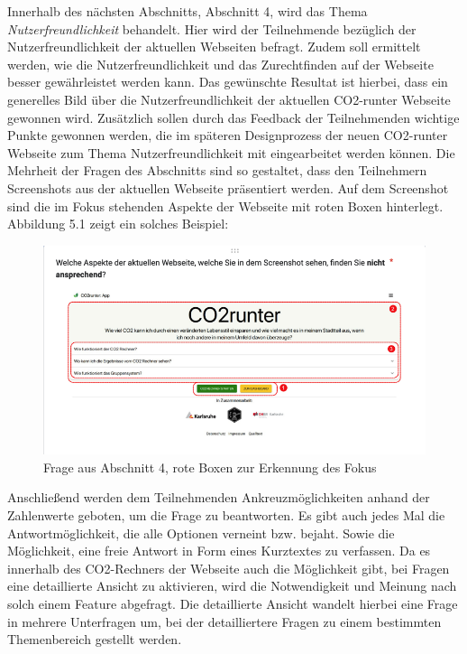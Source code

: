 Innerhalb des nächsten Abschnitts, Abschnitt 4, wird das Thema \textit{Nutzerfreundlichkeit} behandelt.
Hier wird der Teilnehmende bezüglich der Nutzerfreundlichkeit der aktuellen Webseiten befragt.
Zudem soll ermittelt werden, wie die Nutzerfreundlichkeit und das Zurechtfinden auf der Webseite besser gewährleistet werden kann.
Das gewünschte Resultat ist hierbei, dass ein generelles Bild über die Nutzerfreundlichkeit der aktuellen CO2-runter Webseite gewonnen wird.
Zusätzlich sollen durch das Feedback der Teilnehmenden wichtige Punkte gewonnen werden, die im späteren Designprozess der neuen CO2-runter Webseite zum Thema Nutzerfreundlichkeit mit eingearbeitet werden können.
Die Mehrheit der Fragen des Abschnitts sind so gestaltet, dass den Teilnehmern Screenshots aus der aktuellen Webseite präsentiert werden.
Auf dem Screenshot sind die im Fokus stehenden Aspekte der Webseite mit roten Boxen hinterlegt.
Abbildung 5.1 zeigt ein solches Beispiel:
\begin{figure}[h]
    \centering
    \includegraphics[width=1\textwidth]{images/05/picture_of_screenshot_with_boxes}
    \caption{Frage aus Abschnitt 4, rote Boxen zur Erkennung des Fokus}
    \label{picture-of-screenshot-with-boxes}
\end{figure}

Anschließend werden dem Teilnehmenden Ankreuzmöglichkeiten anhand der Zahlenwerte geboten, um die Frage zu beantworten.
Es gibt auch jedes Mal die Antwortmöglichkeit, die alle Optionen verneint bzw. bejaht.
Sowie die Möglichkeit, eine freie Antwort in Form eines Kurztextes zu verfassen.
Da es innerhalb des CO2-Rechners der Webseite auch die Möglichkeit gibt, bei Fragen eine detaillierte Ansicht zu aktivieren, wird die Notwendigkeit und Meinung nach solch einem Feature abgefragt.
Die detaillierte Ansicht wandelt hierbei eine Frage in mehrere Unterfragen um, bei der detailliertere Fragen zu einem bestimmten Themenbereich gestellt werden.\

